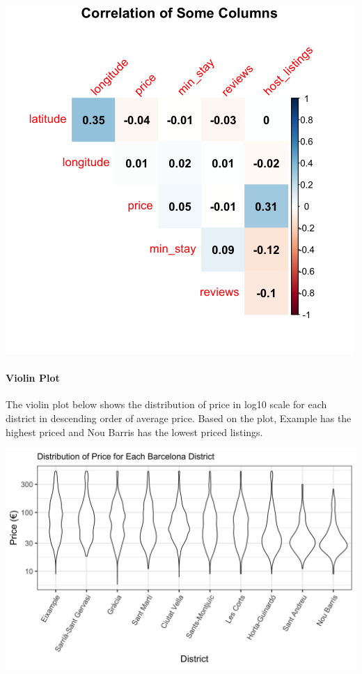 \documentclass[]{article}
\let\oldparagraph\paragraph
\renewcommand{\paragraph}[1]{\oldparagraph{#1}\mbox{}}
\begin{document}
\includegraphics[width=5.20833in,height=\textheight]{../images/correlogram.png}

\hypertarget{violin-plot}{%
\paragraph{Violin Plot}\label{violin-plot}}

The violin plot below shows the distribution of price in log10 scale for
each district in descending order of average price. Based on the plot,
Example has the highest priced and Nou Barris has the lowest priced
listings.

\includegraphics[width=7.8125in,height=\textheight]{../images/violin_plot.png}
\end{document}
